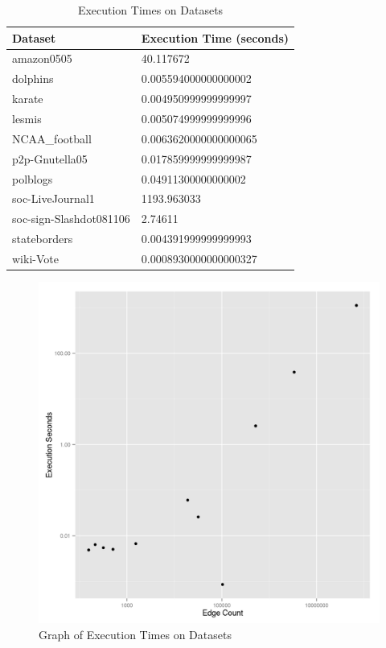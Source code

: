 \documentclass{report}
\begin{document}
\begin{table}
  \centering
  \begin{tabular}{ll}
    \toprule
    Dataset & Execution Time (seconds)\\
    \midrule
    amazon0505 & 40.117672 \\
dolphins & 0.005594000000000002 \\
karate & 0.004950999999999997 \\
lesmis & 0.005074999999999996 \\
NCAA\_football & 0.0063620000000000065 \\
p2p-Gnutella05 & 0.017859999999999987 \\
polblogs & 0.04911300000000002 \\
soc-LiveJournal1 & 1193.963033 \\
soc-sign-Slashdot081106 & 2.74611 \\
stateborders & 0.004391999999999993 \\
wiki-Vote & 0.0008930000000000327 \\
    \bottomrule
  \end{tabular}
  \caption{Execution Times on Datasets}
  \label{execution-times-table}
\end{table}
\begin{figure}
  \centering
  \includegraphics[scale=0.5]{performance.png}
  \caption{Graph of Execution Times on Datasets}
  \label{execution-times-graph}
\end{figure}
\end{document}
